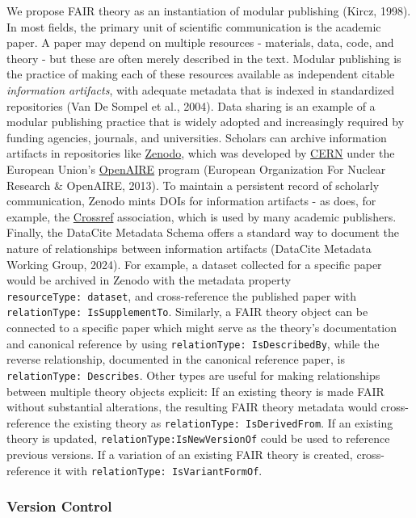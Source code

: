 \documentclass[
  man, noextraspace,floatsintext]{apa7}
\begin{document}
We propose FAIR theory as an instantiation of modular publishing (Kircz, 1998).
In most fields, the primary unit of scientific communication is the academic paper.
A paper may depend on multiple resources - materials, data, code, and theory - but these are often merely described in the text.
Modular publishing is the practice of making each of these resources available as independent citable \emph{information artifacts},
with adequate metadata that is indexed in standardized repositories (Van De Sompel et al., 2004).
Data sharing is an example of a modular publishing practice that is widely adopted and increasingly required by funding agencies, journals, and universities.
Scholars can archive information artifacts in repositories like \href{https://zenodo.org/}{Zenodo},
which was developed by \href{https://home.cern/}{CERN} under the European Union's \href{https://www.openaire.eu/}{OpenAIRE} program (European Organization For Nuclear Research \& OpenAIRE, 2013).
To maintain a persistent record of scholarly communication,
Zenodo mints DOIs for information artifacts - as does, for example, the \href{https://www.crossref.org/}{Crossref} association,
which is used by many academic publishers.
Finally, the DataCite Metadata Schema offers a standard way to document the nature of relationships between information artifacts (DataCite Metadata Working Group, 2024).
For example, a dataset collected for a specific paper would be archived in Zenodo with the metadata property \texttt{resourceType:\ dataset},
and cross-reference the published paper with \texttt{relationType:\ IsSupplementTo}.
Similarly, a FAIR theory object can be connected to a specific paper which might serve as the theory's documentation and canonical reference by using \texttt{relationType:\ IsDescribedBy}, while the reverse relationship, documented in the canonical reference paper, is \texttt{relationType:\ Describes}. Other types are useful for making relationships between multiple theory objects explicit: If an existing theory is made FAIR without substantial alterations,
the resulting FAIR theory metadata would cross-reference the existing theory as \texttt{relationType:\ IsDerivedFrom}.
If an existing theory is updated, \texttt{relationType:IsNewVersionOf} could be used to reference previous versions.
If a variation of an existing FAIR theory is created, cross-reference it with \texttt{relationType:\ IsVariantFormOf}.

\subsubsection{Version Control}\label{version-control}
\end{document}
